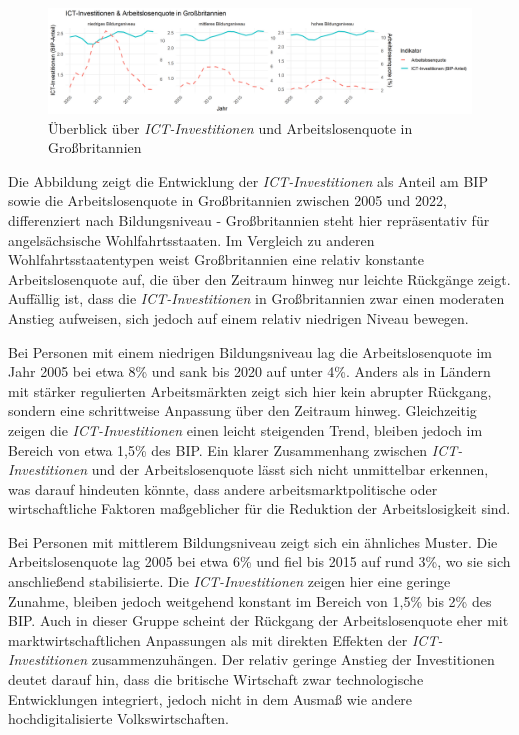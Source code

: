 \begin{figure}[htbp]
    \centering
    \includegraphics[width=\textwidth]{assets/plot_uk.png}
    \caption{Überblick über \textit{\ac{ICT}-Investitionen} und Arbeitslosenquote in 
    Großbritannien}
    \label{fig:uk}
\end{figure}

Die Abbildung zeigt die Entwicklung der \textit{\ac{ICT}-Investitionen} als Anteil am BIP 
sowie die Arbeitslosenquote in Großbritannien zwischen 2005 und 2022, differenziert nach 
Bildungsniveau - Großbritannien steht hier repräsentativ für angelsächsische 
Wohlfahrtsstaaten. Im Vergleich zu anderen Wohlfahrtsstaatentypen weist Großbritannien eine 
relativ konstante Arbeitslosenquote auf, die über den Zeitraum hinweg nur leichte 
Rückgänge zeigt. Auffällig ist, dass die \textit{\ac{ICT}-Investitionen} in Großbritannien 
zwar einen moderaten Anstieg aufweisen, sich jedoch auf einem relativ niedrigen Niveau 
bewegen.

Bei Personen mit einem niedrigen Bildungsniveau lag die Arbeitslosenquote im Jahr 2005 
bei etwa 8\% und sank bis 2020 auf unter 4\%. Anders als in Ländern mit stärker 
regulierten Arbeitsmärkten zeigt sich hier kein abrupter Rückgang, sondern eine 
schrittweise Anpassung über den Zeitraum hinweg. Gleichzeitig zeigen die 
\textit{\ac{ICT}-Investitionen} einen leicht steigenden Trend, bleiben jedoch im Bereich 
von etwa 1,5\% des BIP. Ein klarer Zusammenhang zwischen \textit{\ac{ICT}-Investitionen} 
und der Arbeitslosenquote lässt sich nicht unmittelbar erkennen, was darauf hindeuten 
könnte, dass andere arbeitsmarktpolitische oder wirtschaftliche Faktoren maßgeblicher für 
die Reduktion der Arbeitslosigkeit sind.

Bei Personen mit mittlerem Bildungsniveau zeigt sich ein ähnliches Muster. Die 
Arbeitslosenquote lag 2005 bei etwa 6\% und fiel bis 2015 auf rund 3\%, wo sie sich 
anschließend stabilisierte. Die \textit{\ac{ICT}-Investitionen} zeigen hier eine geringe 
Zunahme, bleiben jedoch weitgehend konstant im Bereich von 1,5\% bis 2\% des BIP. Auch in 
dieser Gruppe scheint der Rückgang der Arbeitslosenquote eher mit marktwirtschaftlichen 
Anpassungen als mit direkten Effekten der \textit{\ac{ICT}-Investitionen} zusammenzuhängen. 
Der relativ geringe Anstieg der Investitionen deutet darauf hin, dass die britische 
Wirtschaft zwar technologische Entwicklungen integriert, jedoch nicht in dem Ausmaß wie 
andere hochdigitalisierte Volkswirtschaften.

